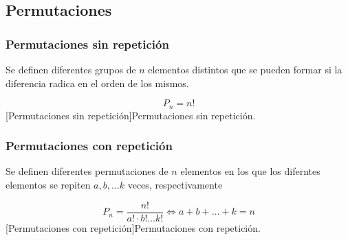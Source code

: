 \subsection{Permutaciones}
\subsubsection{Permutaciones sin repetición}
Se definen diferentes grupos de $n$ elementos distintos que se pueden formar si la diferencia radica en el orden de los mismos.
\begin{center}
    \begin{equation}
        P_n = n!
    \end{equation}
    [Permutaciones sin repetición]{Permutaciones sin repetición.}
\end{center}
\subsubsection{Permutaciones con repetición}
Se definen diferentes permutaciones de $n$ elementos en los que los diferntes elementos se repiten $a, b, \dots k$ veces, respectivamente
\begin{center}
    \begin{equation}
        P_n = \dfrac{n!}{a!\cdot b! \dots k!} \iff a + b +\dots + k = n
    \end{equation}
    [Permutaciones con repetición]{Permutaciones con repetición.}
\end{center}

